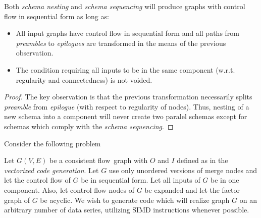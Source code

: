 \begin{observation}
  Both \emph{schema nesting} and \emph{schema sequencing} will produce graphs with control flow in sequential form as long as:
  \begin{itemize}
    \item All input graphs have control flow in sequential form and all paths from \emph{preambles} to \emph{epilogues} are transformed in the means of the previous observation.
    \item The condition requiring all inputs to be in the same component (w.r.t. regularity and connectedness) is not voided.
  \end {itemize} 
  \begin{proof} 
  The key observation is that the previous transformation necessarily splits \emph{preamble} from \emph{epilogue} (with respect to regularity of nodes). Thus, nesting of a new schema into a component will never create two paralel schemas except for schemas which comply with the \emph{schema sequencing}.
  \end{proof}
\end{observation}


Consider the following problem

\begin{problem}
Let $G(V,E)$ be a consistent flow~graph with $O$ and $I$ defined as in the \emph{vectorized code generation}. Let $G$ use only unordered versions of merge nodes and let the control flow of $G$ be in sequential form. Let all inputs of $G$ be in one component. Also, let control flow nodes of $G$ be expanded and let the factor graph of $G$ be acyclic. We wish to generate code which will realize graph $G$ on an arbitrary number of data series, utilizing SIMD instructions whenever possible. 
\end{problem}

